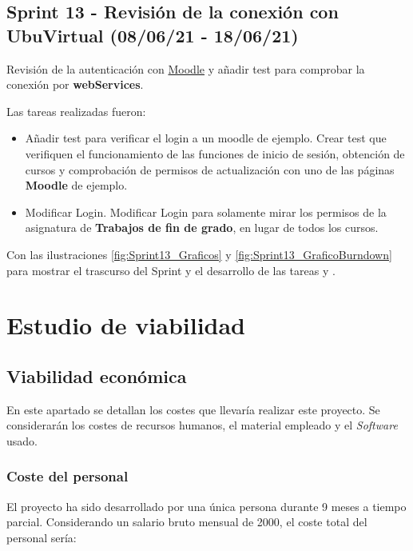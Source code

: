 
\subsection{Sprint 13 - Revisión de la conexión con UbuVirtual (08/06/21 - 18/06/21)}
Revisión de la autenticación con \href{https://moodle.org/}{Moodle} y añadir test para comprobar la conexión por \textbf{webServices}.

Las tareas realizadas fueron:
\begin{itemize}
	\tightlist
	\item Añadir test para verificar el login a un moodle de ejemplo.
		Crear test que verifiquen el funcionamiento de las funciones de inicio de sesión, obtención de cursos y comprobación de permisos de actualización con uno de las páginas \textbf{Moodle} de ejemplo.
	\item Modificar Login.
		Modificar Login para solamente mirar los permisos de la asignatura de \textbf{Trabajos de fin de grado}, en lugar de todos los cursos.
	
\end{itemize}

Con las ilustraciones \ref{fig:Sprint13_Graficos} y \ref{fig:Sprint13_GraficoBurndown} para mostrar el trascurso del Sprint y el desarrollo de las tareas  y .



\section{Estudio de viabilidad}
\subsection{Viabilidad económica}
En este apartado se detallan los costes que llevaría realizar este proyecto. Se considerarán los costes de recursos humanos, el material empleado y el \emph{Software} usado. 

\subsubsection{Coste del personal}
El proyecto ha sido desarrollado por una única persona durante 9 meses a tiempo parcial. Considerando un salario bruto mensual de 2000, el coste total del personal sería:

